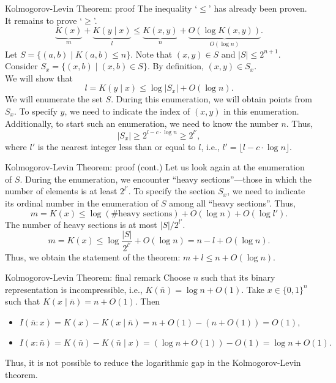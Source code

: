 \documentclass[
aspectratio=169]{beamer}
\begin{document}
\begin{frame}{Kolmogorov-Levin Theorem: proof}
    The inequality `$\le$' has already been proven. It remains to prove `$\ge$'.
    \[
    \underbrace{K(x)}_{m} + \underbrace{K(y \mid x)}_l \le \underbrace{K(x,y)}_n + \underbrace{O(\log K(x,y))}_{O(\log n)}.
    \]
    Let $S = \{(a,b) \mid K(a,b) \le n\}$. Note that $(x,y) \in S$ and $|S| \le 2^{n+1}$.\\
    Consider $S_x = \{(x,b) \mid (x,b) \in S\}$.
    By definition, $(x,y) \in S_x$.
    \\We will show that
    \[
    l = K(y \mid x) \le \log |S_x| + O(\log n).
    \]
    We will enumerate the set $S$. During this enumeration, we will obtain points from $S_x$. To specify $y$, we need to indicate the index of $(x,y)$ in this enumeration. Additionally, to start such an enumeration, we need to know the number $n$. Thus,
    \[|S_x| \ge 2^{l - c \cdot \log n} \ge 2^{l'},\]
    where $l'$ is the nearest integer less than or equal to $l$, i.e., $l' = \lfloor l - c \cdot \log n \rfloor$.

\end{frame}

\begin{frame}{Kolmogorov-Levin Theorem: proof (cont.)}
    Let us look again at the enumeration of $S$. During the enumeration, we encounter ``heavy sections''—those in which the number of elements is at least $2^{l'}$. To specify the section $S_x$, we need to indicate its ordinal number in the enumeration of $S$ among all ``heavy sections''. Thus,
    \[
    m = K(x) \le \log(\text{\# heavy sections}) + O(\log n) + O(\log l').
    \]
    The number of heavy sections is at most $|S|/2^{l'}$.
    \[
    m = K(x) \le \log \frac{|S|}{2^{l'}} + O(\log n) = n - l + O(\log n).
    \]
    Thus, we obtain the statement of the theorem: $m + l \le n + O(\log n)$.

\end{frame}

\begin{frame}{Kolmogorov-Levin Theorem: final remark}
    Choose $n$ such that its binary representation is incompressible, i.e., $K(\bar n) = \log n + O(1)$. Take $x \in \{0,1\}^n$ such that $K(x \mid \bar n) = n + O(1)$. Then
\begin{itemize}
    \item\(
    I(\bar n : x) = K(x) - K(x \mid \bar n) = n + O(1) - (n + O(1)) = O(1),
    \)
    \item\(
    I(x : \bar n) = K(\bar n) - K(\bar n \mid x) = (\log n + O(1)) - O(1) = \log n + O(1).
    \)
\end{itemize}
Thus, it is not possible to reduce the logarithmic gap in the Kolmogorov-Levin theorem.
\end{frame}
\end{document}
